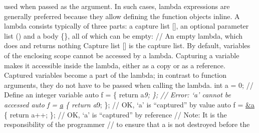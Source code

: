 used when passed as the argument. In such cases, lambda expressions are
generally preferred because they allow deﬁning the function objects
inline. A lambda consists typically of three parts: a capture list
{[}{]}, an optional parameter list () and a body \{\}, all of which can
be empty: \href{}{} // An empty lambda, which does and returns nothing
Capture list {[}{]} is the capture list. By default, variables of the
enclosing scope cannot be accessed by a lambda. Capturing a variable
makes it accessible inside the lambda, either as a copy or as a
reference. Captured variables become a part of the lambda; in contrast
to function arguments, they do not have to be passed when calling the
lambda. int a = 0; // Define an integer variable auto f = \href{}{} \{
return a\emph{9; \}; // Error: `a' cannot be accessed auto f =
\href{}{a} \{ return a}9; \}; // OK, `a' is ``captured'' by value auto f
= \href{}{\&a} \{ return a++; \}; // OK, `a' is ``captured'' by
reference // Note: It is the responsibility of the programmer // to
ensure that a is not destroyed before the
